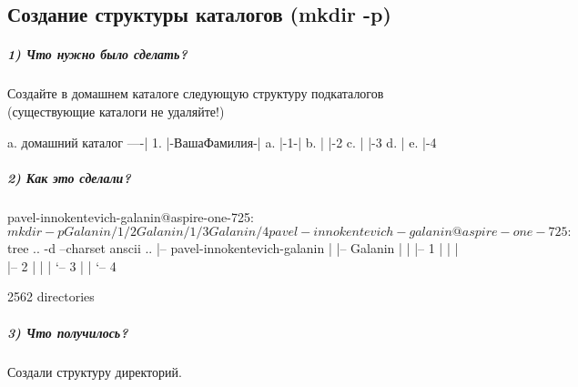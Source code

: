 \subsection{Создание структуры каталогов (mkdir -p)}

\subparagraph{1) Что нужно было сделать?}

Создайте в домашнем каталоге следующую структуру подкаталогов
(существующие каталоги не удаляйте!)

\begin{MyVerbatim}
a. домашний каталог ----|
    1. |-ВашаФамилия-|
        a. |-1-|
        b. | |-2
        c. | |-3
        d. |
        e. |-4
\end{MyVerbatim}

\subparagraph{2) Как это сделали?}

\begin{MyVerbatimCode}[label=Debian terminal]
pavel-innokentevich-galanin@aspire-one-725:~$ mkdir -p Galanin/1/2 Galanin/1/3 Galanin/4
pavel-innokentevich-galanin@aspire-one-725:~$ tree .. -d --charset anscii
..
|-- pavel-innokentevich-galanin
|   |-- Galanin
|   |   |-- 1
|   |   |   |-- 2
|   |   |   `-- 3
|   |   `-- 4

2562 directories
\end{MyVerbatimCode}

\subparagraph{3) Что получилось?}

Создали структуру директорий.